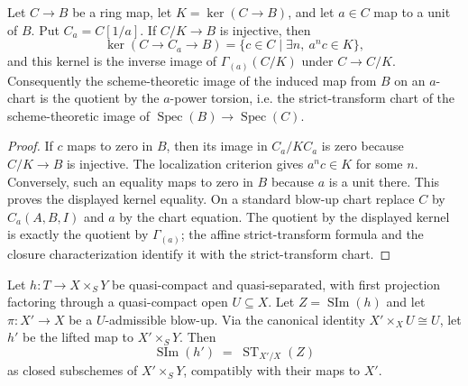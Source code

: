 \begin{lemma}
  \label{lemma:nagata-scheme-image-affine-saturation}
  Let $C\to B$ be a ring map, let $K=\ker(C\to B)$, and let $a\in C$ map
  to a unit of $B$.  Put $C_a=C[1/a]$.  If $C/K\to B$ is injective, then
  \[
    \ker(C\longrightarrow C_a\longrightarrow B)
      =\{c\in C\mid \exists n,\ a^nc\in K\},
  \]
  and this kernel is the inverse image of
  $\Gamma_{(a)}(C/K)$ under $C\to C/K$.
  Consequently the scheme-theoretic image of the induced map from $B$ on an
  $a$-chart is the quotient by the $a$-power torsion, i.e. the strict-transform
  chart of the scheme-theoretic image of $\operatorname{Spec}(B)\to
  \operatorname{Spec}(C)$.
\end{lemma}

\begin{proof}
  If $c$ maps to zero in $B$, then its image in $C_a/KC_a$ is zero because
  $C/K\to B$ is injective.  The localization criterion gives
  $a^nc\in K$ for some $n$.  Conversely, such an equality maps to zero in $B$
  because $a$ is a unit there.  This proves the displayed kernel equality.
  On a standard blow-up chart replace $C$ by $C_a(A,B,I)$ and $a$ by the
  chart equation.  The quotient by the displayed kernel is exactly the
  quotient by $\Gamma_{(a)}$; the affine strict-transform formula and the
  closure characterization identify it with the strict-transform chart.
\end{proof}

\begin{lemma}
  \label{lemma:nagata-scheme-image-transport-strict-transform}
  Let $h\colon T\to X\times_SY$ be quasi-compact and quasi-separated, with
  first projection factoring through a quasi-compact open $U\subseteq X$.
  Let $Z=\operatorname{SIm}(h)$ and let $\pi\colon X'\to X$ be a
  $U$-admissible blow-up.  Via the canonical identity
  $X'\times_XU\cong U$, let $h'$ be the lifted map to $X'\times_SY$.  Then
  \[
    \operatorname{SIm}(h')
      \;=\;\operatorname{ST}_{X'/X}(Z)
  \]
  as closed subschemes of $X'\times_SY$, compatibly with their maps to $X'$.
\end{lemma}

